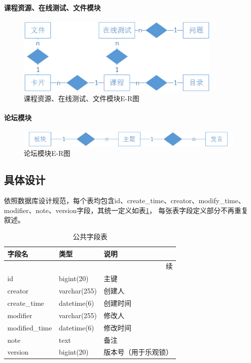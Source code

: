 \documentclass[titlepage,UTF8,linespread=1.5]{ctexart}
\begin{document}
\paragraph{课程资源、在线测试、文件模块}
\begin{figure}[H]
    \centering
    \includegraphics[width=100mm]{er-course-exam-file.png}
    \caption{课程资源、在线测试、文件模块E-R图}
    \label{fig:er-course-exam-file}
\end{figure}
\paragraph{论坛模块}
\begin{figure}[H]
    \centering
    \includegraphics[width=140mm]{er-forum.png}
    \caption{论坛模块E-R图}
    \label{fig:er-forum}
\end{figure}

\subsection{具体设计}
依照数据库设计规范，每个表均包含id、create\_time、creator、modify\_time、modifier、note、version字段，其统一定义如表\ref{tab:table_common}，
每张表字段定义部分不再重复叙述。\par
\begin{longtable}{|p{10em}|p{6em}|p{15em}|}
    \caption{公共字段表}\label{tab:table_common}       \\\hline
    字段名         & 类型         & 说明                 \\\hline
    \endfirsthead
    \multicolumn{3}{r}{{续\tablename\thetable{}}}        \\\hline
    \endhead
    id             & bigint(20)   & 主键                 \\\hline
    creator        & varchar(255) & 创建人               \\\hline
    create\_time   & datetime(6)  & 创建时间             \\\hline
    modifier       & varchar(255) & 修改人               \\\hline
    modified\_time & datetime(6)  & 修改时间             \\\hline
    note           & text         & 备注                 \\\hline
    version        & bigint(20)   & 版本号（用于乐观锁） \\\hline
\end{longtable}\par
\end{document}
